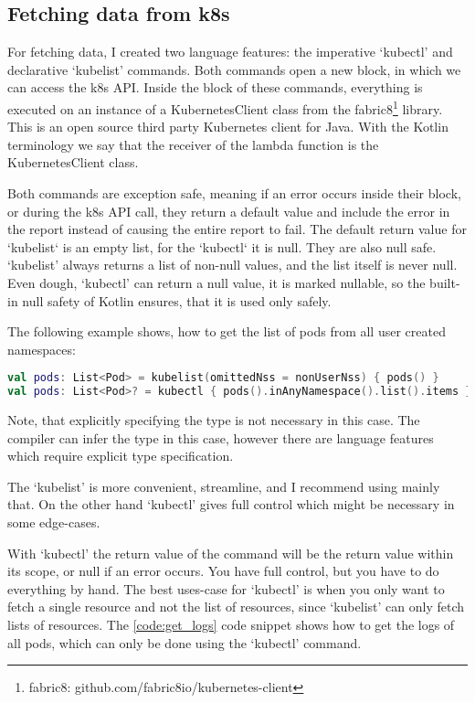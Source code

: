 \subsection{Fetching data from k8s}

For fetching data, I created two language features: the imperative `kubectl' and declarative `kubelist' commands. Both commands open a new block, in which we can access the k8s API. Inside the block of these commands, everything is executed on an instance of a KubernetesClient class from the fabric8\footnote{fabric8: github.com/fabric8io/kubernetes-client} library. This is an open source third party Kubernetes client for Java. With the Kotlin terminology we say that the receiver of the lambda function is the KubernetesClient class.

Both commands are exception safe, meaning if an error occurs inside their block, or during the k8s API call, they return a default value and include the error in the report instead of causing the entire report to fail. The default return value for `kubelist` is an empty list, for the `kubectl` it is null. They are also null safe. `kubelist' always returns a list of non-null values, and the list itself is never null. Even dough, `kubectl' can return a null value, it is marked nullable, so the built-in null safety of Kotlin ensures, that it is used only safely.

The following example shows, how to get the list of pods from all user created namespaces:

\begin{lstlisting}[caption={Usage of kubelist and kubectl},language=Kotlin,label=code:kubelist_usage]
val pods: List<Pod> = kubelist(omittedNss = nonUserNss) { pods() }
val pods: List<Pod>? = kubectl { pods().inAnyNamespace().list().items }?.filter { it.metadata.namespace !in nonUserNss }
\end{lstlisting}

Note, that explicitly specifying the type is not necessary in this case. The compiler can infer the type in this case, however there are language features which require explicit type specification.

The `kubelist' is more convenient, streamline, and I recommend using mainly that. On the other hand `kubectl' gives full control which might be necessary in some edge-cases.

With `kubectl' the return value of the command will be the return value within its scope, or null if an error occurs. You have full control, but you have to do everything by hand. The best uses-case for `kubectl' is when you only want to fetch a single resource and not the list of resources, since `kubelist' can only fetch lists of resources. The \ref{code:get_logs} code snippet shows how to get the logs of all pods, which can only be done using the `kubectl' command.

